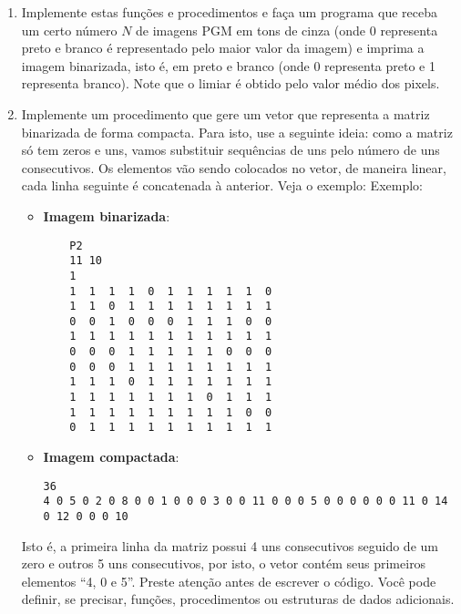 \begin {enumerate}

\item  Implemente estas funções e procedimentos e faça um programa que 
receba um certo número $N$ de imagens PGM em tons de cinza (onde 0
representa preto e branco é representado pelo maior valor da imagem) e
imprima a imagem binarizada, isto é, em preto e branco (onde 0 
representa preto e 1 representa branco). Note que o limiar é obtido
pelo valor médio dos pixels.

\item 
Implemente um procedimento que gere um vetor que representa a matriz 
binarizada de forma compacta. Para isto, use a seguinte ideia: como a
matriz só tem zeros e uns, vamos substituir sequências de uns pelo número
de uns consecutivos. Os elementos vão sendo colocados no vetor, de maneira
linear, cada linha seguinte é concatenada à anterior. Veja o exemplo:
Exemplo:
\begin{itemize}
\vspace*{-2mm}      
    \item \textbf{Imagem binarizada}:
    \begin{verbatim}
    P2
    11 10
    1
    1  1  1  1  0  1  1  1  1  1  0 
    1  1  0  1  1  1  1  1  1  1  1 
    0  0  1  0  0  0  1  1  1  0  0
    1  1  1  1  1  1  1  1  1  1  1
    0  0  0  1  1  1  1  1  0  0  0
    0  0  0  1  1  1  1  1  1  1  1
    1  1  1  0  1  1  1  1  1  1  1
    1  1  1  1  1  1  1  0  1  1  1
    1  1  1  1  1  1  1  1  1  0  0
    0  1  1  1  1  1  1  1  1  1  1
    \end{verbatim}

\vspace*{-4mm}      
    \item \textbf{Imagem compactada}:
    \begin{verbatim}
36
4 0 5 0 2 0 8 0 0 1 0 0 0 3 0 0 11 0 0 0 5 0 0 0 0 0 0 11 0 14 0 12 0 0 0 10
\end{verbatim}
\end{itemize}

Isto é, a primeira linha da matriz possui 4 uns consecutivos seguido de um
zero e outros 5 uns consecutivos, por isto, o vetor contém seus primeiros
elementos ``4, 0 e 5''. Preste atenção antes de escrever o código. Você pode 
definir, se precisar, funções, procedimentos ou estruturas de dados adicionais.
\end{enumerate}



